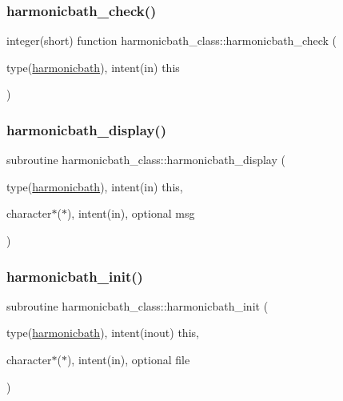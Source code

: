 \subsubsection{\texorpdfstring{harmonicbath\+\_\+check()}{harmonicbath\_check()}}
{\footnotesize\ttfamily integer(short) function harmonicbath\+\_\+class\+::harmonicbath\+\_\+check (\begin{DoxyParamCaption}\item[{type(\hyperlink{structharmonicbath__class_1_1harmonicbath}{harmonicbath}), intent(in)}]{this }\end{DoxyParamCaption})\hspace{0.3cm}{\ttfamily [private]}}

\mbox{\label{namespaceharmonicbath__class_af4ce5a2a61231e5612ff243262e9f993}} 
\subsubsection{\texorpdfstring{harmonicbath\+\_\+display()}{harmonicbath\_display()}}
{\footnotesize\ttfamily subroutine harmonicbath\+\_\+class\+::harmonicbath\+\_\+display (\begin{DoxyParamCaption}\item[{type(\hyperlink{structharmonicbath__class_1_1harmonicbath}{harmonicbath}), intent(in)}]{this,  }\item[{character$\ast$($\ast$), intent(in), optional}]{msg }\end{DoxyParamCaption})\hspace{0.3cm}{\ttfamily [private]}}

\mbox{\label{namespaceharmonicbath__class_a7d869bb99a49aa520fe606e808d5feb5}} 
\subsubsection{\texorpdfstring{harmonicbath\+\_\+init()}{harmonicbath\_init()}}
{\footnotesize\ttfamily subroutine harmonicbath\+\_\+class\+::harmonicbath\+\_\+init (\begin{DoxyParamCaption}\item[{type(\hyperlink{structharmonicbath__class_1_1harmonicbath}{harmonicbath}), intent(inout)}]{this,  }\item[{character$\ast$($\ast$), intent(in), optional}]{file }\end{DoxyParamCaption})\hspace{0.3cm}{\ttfamily [private]}}

